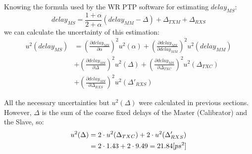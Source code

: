 \noindent Knowing the formula used by the WR PTP software for estimating $delay_{MS}$:
\begin{equation}
	delay_{MS} = \frac{1+\alpha}{2+\alpha}(delay_{MM} - \Delta) + \Delta_{TXM} +
	\Delta_{RXS}
\end{equation}
we can calculate the uncertainty of this estimation:
\begin{align}
	u^2(delay_{MS}) &= \left( \frac{\partial delay_{MS}}{\partial \alpha} \right)^2 u^2(\alpha) + 
	\left( \frac{\partial delay_{MS}}{\partial delay_{MM}}\right)^2 u^2(delay_{MM}) \nonumber\\
	&+ \left( \frac{\partial delay_{MS}}{\partial \Delta}\right)^2 u^2(\Delta) +
	\left( \frac{\partial delay_{MS}}{\partial \Delta_{TXC}}\right)^2 u^2(\Delta_{TXC}) \nonumber\\
	&+ \left( \frac{\partial delay_{MS}}{\partial \Delta_{RXS}}\right)^2 u^2(\Delta'_{RXS})
\end{align}

\noindent All the necessary uncertainties but $u^2(\Delta)$ were calculated in previous
sections. However, $\Delta$ is the sum of the coarse fixed delays of the Master
(Calibrator) and the Slave, so:
\begin{align}
	\label{equ:errors:ubigd}
	u^2(\Delta) &= 2\cdot u^2(\Delta_{TXC}) + 2\cdot u^2(\Delta'_{RXS}) \noindent\\
              &= 2 \cdot 1.43 + 2 \cdot 9.49 = 21.84 [ps^2]
\end{align}

